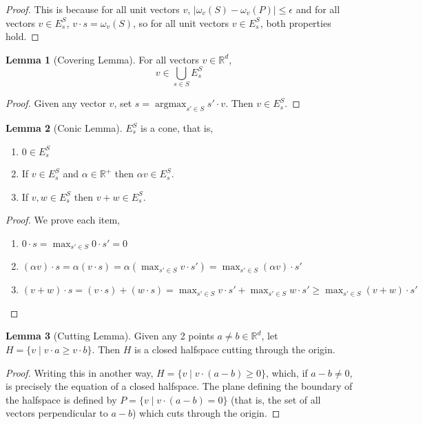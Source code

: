 \documentclass[12pt]{article}
\theoremstyle{definition}
\theoremstyle{lemma}
\newtheorem{lemma}{Lemma}[section]
\theoremstyle{theorem}
\DeclareMathOperator*{\argmax}{argmax}
\begin{document}
\begin{proof}
This is because for all unit vectors $v$, $|\omega_v(S) - \omega_v(P)| \leq \epsilon$ and for all vectors $v \in E^S_s$, $v \cdot s = \omega_v(S)$, so for all unit vectors $v \in E^S_s$, both properties hold.
\end{proof}

\begin{lemma}[Covering Lemma] For all vectors $v \in \mathbb{R}^d$,
\[ v \in \bigcup_{s \in S} E^S_s \]
\end{lemma}

\begin{proof}
Given any vector $v$, set $s = \displaystyle\argmax_{s' \in S} s' \cdot v$. Then $v \in E^S_s$.
\end{proof}

\begin{lemma} [Conic Lemma] $E^S_s$ is a cone, that is,
\begin{enumerate}
\item $0 \in E^S_s$
\item If $v \in E^S_s$ and $\alpha \in \mathbb{R^+}$ then $\alpha v \in E^S_s$.
\item If $v, w \in E^S_s$ then $v + w \in E^S_s$.
\end{enumerate}
\end{lemma}

\begin{proof} We prove each item,
\begin{enumerate}
\item $0 \cdot s = \max_{s' \in S} 0 \cdot s' = 0$
\item $(\alpha v) \cdot s = \alpha (v \cdot s) = \alpha (\max_{s' \in S} v \cdot s') = \max_{s' \in S} (\alpha v) \cdot s'$
\item $(v + w) \cdot s = (v \cdot s) + (w \cdot s) = \max_{s' \in S} v \cdot s' + \max_{s' \in S} w \cdot s' \geq \max_{s' \in S} (v + w) \cdot s'$
\end{enumerate}
\end{proof}

\begin{lemma} [Cutting Lemma] Given any 2 points $a \neq b \in \mathbb{R}^d$, let $H = \{v \; | \; v \cdot a \geq v \cdot b\}$. Then $H$ is a closed halfspace cutting through the origin.
\end{lemma}

\begin{proof}
Writing this in another way, $H = \{v \; | \; v \cdot (a - b) \geq 0\}$, which, if $a-b \neq 0$, is precisely the equation of a closed halfspace. The plane defining the boundary of the halfspace is defined by $P = \{v \; | \; v \cdot (a - b) = 0\}$ (that is, the set of all vectors perpendicular to $a-b$) which cuts through the origin.
\end{proof}
\end{document}
